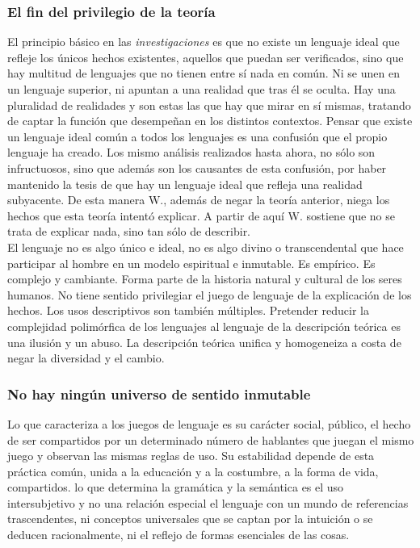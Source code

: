 \documentclass[a4paper, 11pt, twocolumn, spanish]{article}
\begin{document}
\subsubsection{El fin del privilegio de la teoría}
\label{sec:org22939cb}
El principio básico en las \emph{investigaciones} es que no existe un
lenguaje ideal que refleje los únicos hechos existentes, aquellos que
puedan ser verificados, sino que hay multitud de lenguajes que no
tienen entre sí nada en común. Ni se unen en un lenguaje superior, ni
apuntan a una realidad que tras él se oculta. Hay una pluralidad de
realidades y son estas las que hay que mirar en sí mismas, tratando de
captar la función que desempeñan en los distintos contextos. Pensar
que existe un lenguaje ideal común a todos los lenguajes es una
confusión que el propio lenguaje ha creado. Los mismo análisis
realizados hasta ahora, no sólo son infructuosos, sino que además son
los causantes de esta confusión, por haber mantenido la tesis de que
hay un lenguaje ideal que refleja una realidad subyacente. De esta
manera W., además de negar la teoría anterior, niega los hechos que
esta teoría intentó explicar. A partir de aquí W. sostiene que no se
trata de explicar nada, sino tan sólo de describir.\\

El lenguaje no es algo único e ideal, no es algo divino o
transcendental que hace participar al hombre en un modelo espiritual e
inmutable. Es empírico. Es complejo y cambiante. Forma parte de la
historia natural y cultural de los seres humanos. No tiene sentido
privilegiar el juego de lenguaje de la explicación de los hechos. Los
usos descriptivos son también múltiples. Pretender reducir la
complejidad polimórfica de los lenguajes al lenguaje de la descripción
teórica es una ilusión y un abuso. La descripción teórica unifica y
homogeneiza a costa de negar la diversidad y el cambio.\\

\subsubsection{No hay ningún universo de sentido inmutable}
\label{sec:orgbf25239}
Lo que caracteriza a los juegos de lenguaje es su carácter social,
público, el hecho de ser compartidos por un determinado número de
hablantes que juegan el mismo juego y observan las mismas reglas de
uso. Su estabilidad depende de esta práctica común, unida a la
educación y a la costumbre, a la forma de vida, compartidos. lo que
determina la gramática y la semántica es el uso intersubjetivo y no
una relación especial el lenguaje con un mundo de referencias
trascendentes, ni conceptos universales que se captan por la intuición
o se deducen racionalmente, ni el reflejo de formas esenciales de las
cosas.\\
\end{document}
